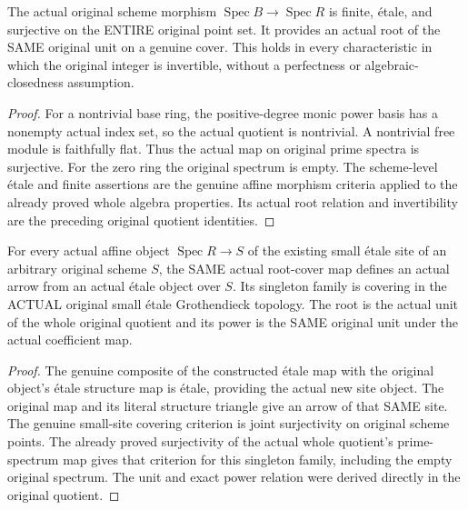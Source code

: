 \begin{theorem}\label{thm:actual-kummer-unit-root-surjective-cover}
\leanok
{}
The actual original scheme morphism $\operatorname{Spec}B\to\operatorname{Spec}R$ is finite, étale, and surjective on the ENTIRE original point set. It provides an actual root of the SAME original unit on a genuine cover. This holds in every characteristic in which the original integer is invertible, without a perfectness or algebraic-closedness assumption.
\end{theorem}
\begin{proof}
For a nontrivial base ring, the positive-degree monic power basis has a nonempty actual index set, so the actual quotient is nontrivial. A nontrivial free module is faithfully flat. Thus the actual map on original prime spectra is surjective. For the zero ring the original spectrum is empty. The scheme-level étale and finite assertions are the genuine affine morphism criteria applied to the already proved whole algebra properties. Its actual root relation and invertibility are the preceding original quotient identities.
\end{proof}
\begin{theorem}\label{thm:actual-kummer-unit-root-small-etale-cover}
\leanok
{}
For every actual affine object $\operatorname{Spec}R\to S$ of the existing small étale site of an arbitrary original scheme $S$, the SAME actual root-cover map defines an actual arrow from an actual étale object over $S$. Its singleton family is covering in the ACTUAL original small étale Grothendieck topology. The root is the actual unit of the whole original quotient and its power is the SAME original unit under the actual coefficient map.
\end{theorem}
\begin{proof}
The genuine composite of the constructed étale map with the original object's étale structure map is étale, providing the actual new site object. The original map and its literal structure triangle give an arrow of that SAME site. The genuine small-site covering criterion is joint surjectivity on original scheme points. The already proved surjectivity of the actual whole quotient's prime-spectrum map gives that criterion for this singleton family, including the empty original spectrum. The unit and exact power relation were derived directly in the original quotient.
\end{proof}
